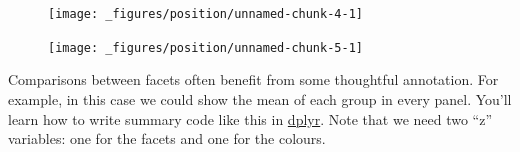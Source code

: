 \begin{Shaded}
\begin{Highlighting}[]
\StringTok{ }\NormalTok{(}
   \NormalTok{(}\NormalTok{, }\NormalTok{(}\NormalTok{, }\NormalTok{, }\NormalTok{)),}
   \NormalTok{(}\NormalTok{, }\NormalTok{(}\NormalTok{, }\NormalTok{, }\NormalTok{)),}
   \NormalTok{letters[}\NormalTok{:}\NormalTok{]}
\NormalTok{)}

\StringTok{ }
\StringTok{  }\NormalTok{(}\NormalTok{(} 
\end{Highlighting}
\end{Shaded}

\begin{figure}[H]
  \centering
  \texttt{[image: \_figures/position/unnamed-chunk-4-1]}
\end{figure}

\begin{Shaded}
\begin{Highlighting}[]
\StringTok{ }
\StringTok{  }\NormalTok{() +}\StringTok{ }
\StringTok{  }
\end{Highlighting}
\end{Shaded}

\begin{figure}[H]
  \texttt{[image: \_figures/position/unnamed-chunk-5-1]}
\end{figure}

Comparisons between facets often benefit from some thoughtful
annotation. For example, in this case we could show the mean of each
group in every panel. You'll learn how to write summary code like this
in \protect\hyperlink{cha:dplyr}{dplyr}. Note that we need two ``z''
variables: one for the facets and one for the colours.

